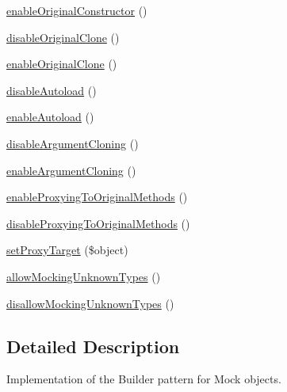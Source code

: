 \begin{DoxyCompactItemize}
\item 
\mbox{\hyperlink{class_p_h_p_unit___framework___mock_object___mock_builder_af1b747910ca8a11783ac67cd942dbd53}{enable\+Original\+Constructor}} ()
\item 
\mbox{\hyperlink{class_p_h_p_unit___framework___mock_object___mock_builder_a24e6ceda1a371916818074bb491c7b90}{disable\+Original\+Clone}} ()
\item 
\mbox{\hyperlink{class_p_h_p_unit___framework___mock_object___mock_builder_ac06ee5b49cd8ae68cb7e072380593df8}{enable\+Original\+Clone}} ()
\item 
\mbox{\hyperlink{class_p_h_p_unit___framework___mock_object___mock_builder_a99413480c96935be683033999da633d7}{disable\+Autoload}} ()
\item 
\mbox{\hyperlink{class_p_h_p_unit___framework___mock_object___mock_builder_a0ba499758ad2a729532aabad1fbb0abe}{enable\+Autoload}} ()
\item 
\mbox{\hyperlink{class_p_h_p_unit___framework___mock_object___mock_builder_ad0d2332a31f15a18157ec118935ff6f7}{disable\+Argument\+Cloning}} ()
\item 
\mbox{\hyperlink{class_p_h_p_unit___framework___mock_object___mock_builder_a8e48ca0c7e6a7a3a55018e8b1767050e}{enable\+Argument\+Cloning}} ()
\item 
\mbox{\hyperlink{class_p_h_p_unit___framework___mock_object___mock_builder_a5896d495f4fe2aa455c74a08316675b2}{enable\+Proxying\+To\+Original\+Methods}} ()
\item 
\mbox{\hyperlink{class_p_h_p_unit___framework___mock_object___mock_builder_a8be4afab6735166785c02ebe100fbc81}{disable\+Proxying\+To\+Original\+Methods}} ()
\item 
\mbox{\hyperlink{class_p_h_p_unit___framework___mock_object___mock_builder_a4e89a96dc252c1edfe3d12d328ef95a0}{set\+Proxy\+Target}} (\$object)
\item 
\mbox{\hyperlink{class_p_h_p_unit___framework___mock_object___mock_builder_ac903aa0556b5db1166294c7007ee19bc}{allow\+Mocking\+Unknown\+Types}} ()
\item 
\mbox{\hyperlink{class_p_h_p_unit___framework___mock_object___mock_builder_ae3c9fc9227b7c747c0612844107f476f}{disallow\+Mocking\+Unknown\+Types}} ()
\end{DoxyCompactItemize}


\subsection{Detailed Description}
Implementation of the Builder pattern for Mock objects.


